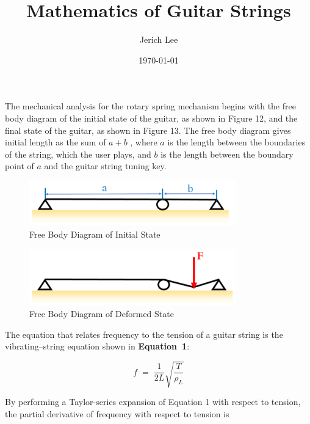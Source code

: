 \documentclass[12pt]{article}
\title{Mathematics of Guitar Strings}
\author{Jerich Lee}
\date{\today}
\theoremstyle{definition} %
\theoremstyle{plain} %
\begin{document}
\maketitle
The mechanical analysis for the rotary spring mechanism begins with the free body diagram
of the initial state of the guitar, as shown in Figure 12, and the final state of the guitar, as shown in
Figure 13. The free body diagram gives initial length as the sum of $a+b$ , where $a$ is the length
between the boundaries of the string, which the user plays, and $b$ is the length between the
boundary point of $a$ and the guitar string tuning key.

\begin{figure}[htbp]
  \centering
  \includegraphics[width=0.8\textwidth]{classes/Mathematics-of-Guitar-Strings/06-10/fgs/fig12.png}
  \caption{Free Body Diagram of Initial State}
  \label{fig:}
\end{figure}

\begin{figure}[htbp]
  \centering
  \includegraphics[width=0.8\textwidth]{classes/Mathematics-of-Guitar-Strings/06-10/fgs/fig13.png}
  \caption{Free Body Diagram of Deformed State}
  \label{fig:}
\end{figure}


The equation that relates frequency to the tension of a guitar string is
the vibrating–string equation shown in \textbf{Equation~1}:

\begin{equation}
  f \;=\; \frac{1}{2L}\sqrt{\frac{T}{\rho_L}}
  \tag{1}
\end{equation}

By performing a Taylor-series expansion of Equation 1 with respect to
tension, the partial derivative of frequency with respect to tension is
\end{document}
